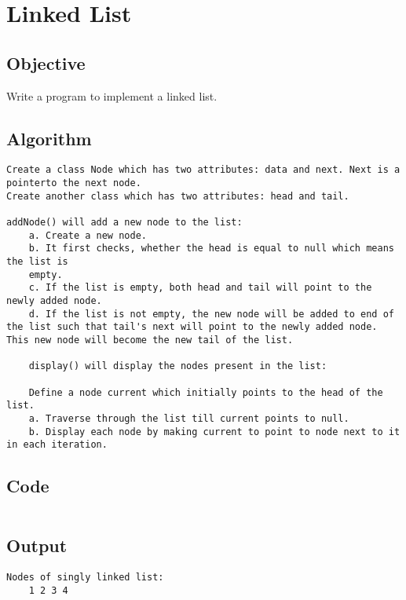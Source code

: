\section{Linked List}
\label{sec:Linked List}

\subsection{Objective}
Write a program to implement a linked list.

\subsection{Algorithm}
\begin{lstlisting}[style=mystyle]
Create a class Node which has two attributes: data and next. Next is a pointerto the next node.
Create another class which has two attributes: head and tail.

addNode() will add a new node to the list:
    a. Create a new node.
    b. It first checks, whether the head is equal to null which means the list is
    empty.
    c. If the list is empty, both head and tail will point to the newly added node.
    d. If the list is not empty, the new node will be added to end of the list such that tail's next will point to the newly added node. This new node will become the new tail of the list.

    display() will display the nodes present in the list:

    Define a node current which initially points to the head of the list.
    a. Traverse through the list till current points to null.
    b. Display each node by making current to point to node next to it in each iteration.
\end{lstlisting}

\subsection{Code}
\inputminted[]{c}{../../Code/linkedList.c}

\subsection{Output}
\begin{lstlisting}[style=output]
    Nodes of singly linked list:
    1 2 3 4
\end{lstlisting}

\pagebreak

